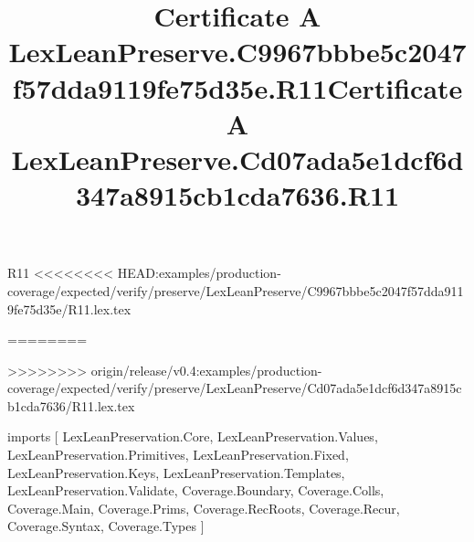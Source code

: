 \begin{lexlean}{R11}
<<<<<<<< HEAD:examples/production-coverage/expected/verify/preserve/LexLeanPreserve/C9967bbbe5c2047f57dda9119fe75d35e/R11.lex.tex
\title{Certificate A LexLeanPreserve.C9967bbbe5c2047f57dda9119fe75d35e.R11}
========
\title{Certificate A LexLeanPreserve.Cd07ada5e1dcf6d347a8915cb1cda7636.R11}
>>>>>>>> origin/release/v0.4:examples/production-coverage/expected/verify/preserve/LexLeanPreserve/Cd07ada5e1dcf6d347a8915cb1cda7636/R11.lex.tex
\begin{coremodule}
imports [
  LexLeanPreservation.Core,
  LexLeanPreservation.Values,
  LexLeanPreservation.Primitives,
  LexLeanPreservation.Fixed,
  LexLeanPreservation.Keys,
  LexLeanPreservation.Templates,
  LexLeanPreservation.Validate,
  Coverage.Boundary,
  Coverage.Colls,
  Coverage.Main,
  Coverage.Prims,
  Coverage.RecRoots,
  Coverage.Recur,
  Coverage.Syntax,
  Coverage.Types
]


\end{coremodule}
\end{lexlean}
